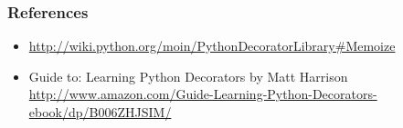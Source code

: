 \documentclass[c]{beamer}
\begin{document}
\begin{frame}[fragile]
\frametitle{References}

\begin{itemize}

\item \url{http://wiki.python.org/moin/PythonDecoratorLibrary\#Memoize}

\item Guide to: Learning Python Decorators by Matt Harrison
\url{http://www.amazon.com/Guide-Learning-Python-Decorators-ebook/dp/B006ZHJSIM/}
\end{itemize}
\end{frame}
\end{document}
